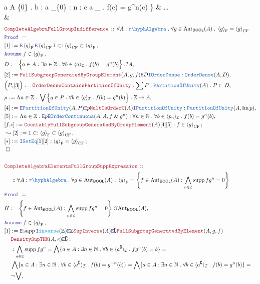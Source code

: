 \documentclass[12pt]{scrartcl}
\newcommand{\TYPE}[1]{\textcolor{NavyBlue}{\mathtt{#1}}}
\newcommand{\FUNC}[1]{\textcolor{Cerulean}{\mathtt{#1}}}
\newcommand{\LOGIC}[1]{\textcolor{Blue}{\mathtt{#1}}}
\newcommand{\THM}[1]{\textcolor{Maroon}{\mathtt{#1}}}
\renewcommand{\.}{\; . \;}
\newcommand{\de}{: \kern 0.1pc =}
\newcommand{\Theorem}[2]{& \THM{#1} \, :: \, #2 \\ & \Proof = \\ }
\newcommand{\NewLine}{\\ & \kern 1pc}
\newcommand{\Page}[1]{ \begin{align*} #1 \end{align*}   }
\newcommand{\NoProof}{ & \ldots \\ \EndProof}
\renewcommand{\And}{\; \& \;}
\newcommand{\Intro}{\LOGIC{I}}
\newcommand{\Elim}{\LOGIC{E}}
\newcommand{\Int}{\mathbb{Z} }
\newcommand{\Nat}{\mathbb{N} }
\DeclareMathOperator*{\im}{Im}
\DeclareMathOperator*{\supp}{supp}
\newcommand{\Aut}{\mathrm{Aut}}
\renewcommand{\c}{\complement}
\newcommand{\Say}[3]{& #1 \de #2 : #3, \\}
\newcommand{\Conclude}[3]{& #1 \de #2 : #3; \\}
\newcommand{\Derive}[3]{& \leadsto #1 \de #2 : #3, \\}
\newcommand{\AssumeIn}[2]{& \LOGIC{Assume} \; #1 \in #2, \\}
\newcommand{\QED}{\; \square}
\newcommand{\EndProof}{& \QED \\}
\newcommand{\Proof}{\LOGIC{Proof} \; }
\newcommand{\I}{\mathcal{I}}
\newcommand{\PoU}{\TYPE{PartitionOfUnity}}
\newcommand{\oC}{\TYPE{OrderContinuous}}
\newcommand{\OD}{\TYPE{OrderDense}}
\newcommand{\TAlgebra}{\TYPE{\tau\hyph Algebra}}
\newcommand{\genFS}[1]{\left\langle #1 \right\rangle_\mathrm{F}}
\newcommand{\genCFS}[1]{\left\langle #1 \right\rangle_\mathrm{CF}}
\newcommand{\BOOL}{\mathsf{BOOL}}
\begin{document}
{{			\forall a \in A \setminus \{0\} \.
			\exists b : \langle a \rangle_\I \setminus \{0\} :
			\exists n \in \Int :
			\forall c \in \langle a \rangle_\I \.
			f(c) =  g^n(c)  
		\Big\}	
	}
	\NoProof
}\Page{
	\Theorem{CompleteAlgebraFullGroupIndifference}
	{
		\forall A : \TAlgebra \.
		\forall g \in \Aut_\BOOL(A) \.
		\genFS{g} = \genCFS{g}
	}
	\Say{[1]}{\Elim \genFS{g} \Elim \genCFS{g} \Intro \subset}{\genCFS{g} \subset \genFS{g}}
	\AssumeIn{f}{\genFS{g}}
	\Say{D}{ 
		\Big\{ 
			a \in A : 
			\exists n \in \Int : 
			\forall b \in \langle a \rangle_\I \.
			f(b) = g^n(b)   
		\Big\}     
	}{?A}
	\Say{[2]}{\THM{FullSubgroupGeneratedByGroupElement}(A,g,f) \Elim D \Intro \OD}
	{\OD(A,D)}
	\Say{\Big(P,[3]\Big)}{\THM{OrderDenseContainsPartitionOfUnity}}
	{
		\sum P : \PoU(A) \. P \subset D
	}
	\Say{p}
	{		\Lambda n \in \Int \.  
			\bigvee \Big\{ q \in P : \forall b \in \langle q \rangle_\I \.
			f(b) = g^n(b)    \Big\} 
	}{\Int \to A}
	\Say{[4]}{\Elim \PoU(A,P) \Elim p \THM{MultIsOrderC}(A) \Intro \PoU}
	{
		\PoU(A,\im p)
	}
	\Say{[5]}{\Lambda n \in \Int \. \Elim p \Elim \oC(A,A,f \And g^n)}
	{
		\forall n \in \Nat \. \forall b \in \langle p_n \rangle_\I \.
		 f(b) = g^n(b)
	}
	\Conclude{[f.*]}{\THM{CountablyFullSubgroupGeneratedByGroupElement}(A)[4][5]}
	{
		f \in \genCFS{g}
	}
	\Derive{[2]}{\Intro \subset }{\genFS{g} \subset \genCFS{g}}
	\Conclude{[*]}{\Intro \TYPE{SetEq}[1][2]}{\genFS{g} = \genCFS{g}}
	\EndProof
	\\
	\Theorem{CompleteAlgebraElementsFullGroupSuppExpression}
	{	
		\NewLine
		::
		\forall A : \TAlgebra \.
		\forall g \in \Aut_\BOOL(A) \.
		\genFS{g} = \left\{ 
			f \in \Aut_\BOOL(A) :     \bigwedge_{n \in \Int} \supp fg^n = 0
			\right\}
	}
	\Say{H}{   
		\left\{
			f \in \Aut_\BOOL(A)
			:     \bigwedge_{n \in \Int} \supp fg^n = 0
		\right\}	
	}{?\Aut_\BOOL(A)}	
	\AssumeIn{f}{\genFS{g}}
	\Say{[1]}
	{
		\Elim \supp
		\Intro \FUNC{inverse}(\Int)
		\Elim \Int
		\THM{SupInverse}(A)
		\Elim \c
		\THM{FullSubgroupGeneratedByElement}(A,g,f)
		\NewLine
		\THM{DensitySupTHM}(A,e)
		\Elim \c
	}
	{
		\NewLine :		
		\bigwedge_{n \in \Int} \supp fg^n  =
		\bigwedge 
		\{  
			a \in A : \exists n \in \Nat \.  
			\forall b \in \langle a^\c \rangle_\I \.
			fg^n(b) = b                   
		\} = \NewLine
		\bigwedge 
		\{  
			a \in A : \exists n \in \Nat \.  
			\forall b \in \langle a^\c \rangle_\I \.
			f(b) = g^{-n}(b)                   
		\} = 
		\bigwedge 
		\{  
			a \in A : \exists n \in \Nat \.  
			\forall b \in \langle a^\c \rangle_\I \.
			f(b) = g^{n}(b)                   
		\} =  \NewLine
		\neg \bigvee
}}
\end{document}
